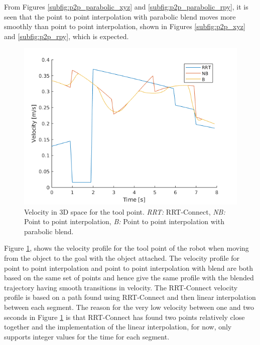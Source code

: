 \documentclass[../main.tex]{subfiles}
\begin{document}
From Figures \ref{subfig:p2p_parabolic_xyz} and \ref{subfig:p2p_parabolic_rpy}, it is seen that the point to point interpolation with parabolic blend moves more smoothly than point to point interpolation, shown in Figures \ref{subfig:p2p_xyz} and \ref{subfig:p2p_rpy}, which is expected.

\begin{figure}[H]
    \centering
    \includegraphics[width=.5\textwidth]{figures/robot_motion_planning/Tool_velocity.png}
    \caption{Velocity in 3D space for the tool point. \textit{RRT:} RRT-Connect, \textit{NB:} Point to point interpolation, \textit{B:} Point to point interpolation with parabolic blend.}
    \label{fig:tool_3d_velocity}
\end{figure}

Figure \ref{fig:tool_3d_velocity}, shows the velocity profile for the tool point of the robot when moving from the object to the goal with the object attached. The velocity profile for point to point interpolation and point to point interpolation with blend are both based on the same set of points and hence give the same profile with the blended trajectory having smooth transitions in velocity. The RRT-Connect velocity profile is based on a path found using RRT-Connect and then linear interpolation between each segment. The reason for the very low velocity between one and two seconds in Figure \ref{fig:tool_3d_velocity} is that RRT-Connect has found two points relatively close together and the implementation of the linear interpolation, for now, only supports integer values for the time for each segment.
\end{document}
